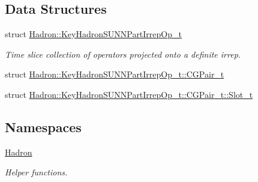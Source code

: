 \subsection*{Data Structures}
\begin{DoxyCompactItemize}
\item 
struct \mbox{\hyperlink{structHadron_1_1KeyHadronSUNNPartIrrepOp__t}{Hadron\+::\+Key\+Hadron\+S\+U\+N\+N\+Part\+Irrep\+Op\+\_\+t}}
\begin{DoxyCompactList}\small\item\em Time slice collection of operators projected onto a definite irrep. \end{DoxyCompactList}\item 
struct \mbox{\hyperlink{structHadron_1_1KeyHadronSUNNPartIrrepOp__t_1_1CGPair__t}{Hadron\+::\+Key\+Hadron\+S\+U\+N\+N\+Part\+Irrep\+Op\+\_\+t\+::\+C\+G\+Pair\+\_\+t}}
\item 
struct \mbox{\hyperlink{structHadron_1_1KeyHadronSUNNPartIrrepOp__t_1_1CGPair__t_1_1Slot__t}{Hadron\+::\+Key\+Hadron\+S\+U\+N\+N\+Part\+Irrep\+Op\+\_\+t\+::\+C\+G\+Pair\+\_\+t\+::\+Slot\+\_\+t}}
\end{DoxyCompactItemize}
\subsection*{Namespaces}
\begin{DoxyCompactItemize}
\item 
 \mbox{\hyperlink{namespaceHadron}{Hadron}}
\begin{DoxyCompactList}\small\item\em Helper functions. \end{DoxyCompactList}\end{DoxyCompactItemize}
